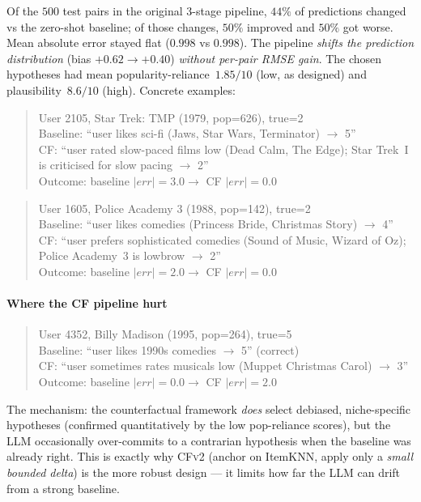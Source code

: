 \documentclass[11pt,a4paper]{article}
\begin{document}
Of the $500$ test pairs in the original 3-stage pipeline, $44\%$ of
predictions changed vs the zero-shot baseline; of those changes, $50\%$
improved and $50\%$ got worse. Mean absolute error stayed flat ($0.998$ vs
$0.998$). The pipeline \emph{shifts the prediction distribution}
(bias $+0.62 \to +0.40$) \emph{without per-pair RMSE gain}. The chosen
hypotheses had mean popularity-reliance~$1.85/10$ (low, as designed) and
plausibility~$8.6/10$ (high). Concrete examples:

\begin{quote}
\small\ttfamily
User 2105, Star Trek: TMP (1979, pop=626), true=2\\
Baseline: ``user likes sci-fi (Jaws, Star Wars, Terminator) $\to$ 5''\\
CF: ``user rated slow-paced films low (Dead Calm, The Edge); Star Trek~I\\
     is criticised for slow pacing $\to$ 2''\\
Outcome: baseline $|err|{=}3.0 \to$ CF $|err|{=}0.0$\quad\checkmark
\end{quote}

\begin{quote}
\small\ttfamily
User 1605, Police Academy 3 (1988, pop=142), true=2\\
Baseline: ``user likes comedies (Princess Bride, Christmas Story) $\to$ 4''\\
CF: ``user prefers sophisticated comedies (Sound of Music, Wizard of Oz);\\
     Police Academy~3 is lowbrow $\to$ 2''\\
Outcome: baseline $|err|{=}2.0 \to$ CF $|err|{=}0.0$\quad\checkmark
\end{quote}

\paragraph{Where the CF pipeline hurt}
\begin{quote}
\small\ttfamily
User 4352, Billy Madison (1995, pop=264), true=5\\
Baseline: ``user likes 1990s comedies $\to$ 5''            (correct)\\
CF: ``user sometimes rates musicals low (Muppet Christmas Carol) $\to$ 3''\\
Outcome: baseline $|err|{=}0.0 \to$ CF $|err|{=}2.0$\quad\texttimes
\end{quote}

The mechanism: the counterfactual framework \emph{does} select debiased,
niche-specific hypotheses (confirmed quantitatively by the low
pop-reliance scores), but the LLM occasionally over-commits to a
contrarian hypothesis when the baseline was already right. This is exactly
why \textsc{CFv2} (anchor on ItemKNN, apply only a \emph{small bounded
delta}) is the more robust design --- it limits how far the LLM can drift
from a strong baseline.
\end{document}
